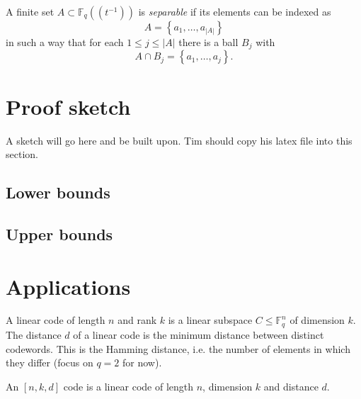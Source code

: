 \documentclass{amsart}
\newcommand{\ffield}{\mathbb{F}_q(\!(t^{-1})\!)}
\begin{document}
A finite set $A \subset \ffield$ is {\em separable} if its elements can be indexed as
	\[A=\left\{a_1,\ldots,a_{|A|}\right\}\]
in such a way that for each $1 \leq j \leq |A|$ there is a ball $B_j$ with 
	\[A \cap B_j =\left\{a_1,\ldots,a_j\right\}.\] 
	
\section{Proof sketch}
A sketch will go here and be built upon. Tim should copy his latex file into this section.

\subsection{Lower bounds}

\subsection{Upper bounds}

\section{Applications}
A linear code of length $n$ and rank $k$ is a linear subspace $C\leq \mathbb{F}_q^n$ of dimension $k$. The distance $d$ of a linear code is the minimum distance between distinct codewords. This is the Hamming distance, i.e. the number of elements in which they differ (focus on $q=2$ for now). 

An $[n,k,d]$ code is a linear code of length $n$, dimension $k$ and distance $d$.
\end{document}
